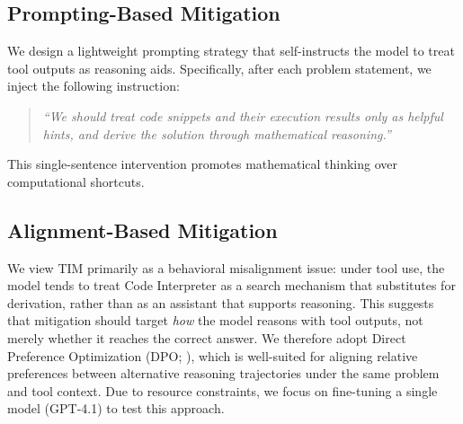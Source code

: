 \documentclass[11pt]{article}
\def \task{\textsc{TIM}\xspace}
\newcommand{\pouya}[1]{{\color{violet}Pouya: #1}}
\begin{document}
\subsection{Prompting-Based Mitigation}
\label{sec:prompting_mitigation}

We design a lightweight prompting strategy that self-instructs the model to treat tool outputs as reasoning aids. Specifically, after each problem statement, we inject the following instruction:

\begin{quote}
\vspace{-0.5mm}
\textit{``We should treat code snippets and their execution results only as helpful hints, and derive the solution through mathematical reasoning.''}
\vspace{-0.5mm}
\end{quote}

\noindent
This single-sentence intervention promotes mathematical thinking over computational shortcuts.


\subsection{Alignment-Based Mitigation}
\label{sec:alignment_tuning}

We view \task{} primarily as a behavioral misalignment issue: under tool use, the model tends to treat Code Interpreter as a search mechanism that substitutes for derivation, rather than as an assistant that supports reasoning. This suggests that mitigation should target \emph{how} the model reasons with tool outputs, not merely whether it reaches the correct answer. We therefore adopt Direct Preference Optimization (DPO; \citep{10.5555/3666122.3668460}), which is well-suited for aligning relative preferences between alternative reasoning trajectories under the same problem and tool context. Due to resource constraints, we focus on fine-tuning a single model (GPT-4.1) to test this approach.


\end{document}
